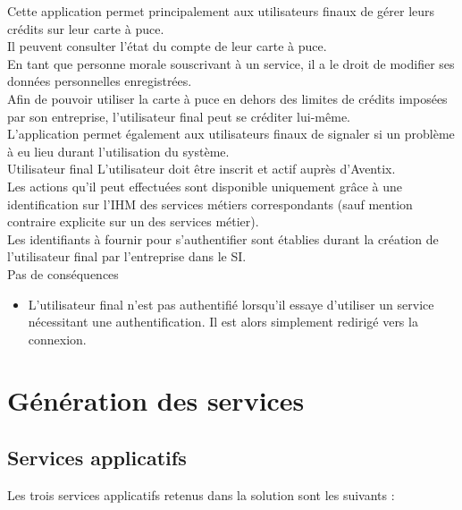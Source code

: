 \CUBref
{}%
{
  Cette application permet principalement aux utilisateurs finaux de gérer leurs
  crédits sur leur carte à puce. \\

  Il peuvent consulter l'état du compte de leur carte à puce. \\

  En tant que personne morale souscrivant à un service, il a le droit de
  modifier ses données personnelles enregistrées. \\

  Afin de pouvoir utiliser la carte à puce en dehors des limites de crédits
  imposées par son entreprise, l'utilisateur final peut se créditer lui-même. \\

  L'application permet également aux utilisateurs finaux de signaler si un
  problème à eu lieu durant l'utilisation du système. \\
}
{Utilisateur final}
{
  L'utilisateur doit être inscrit et actif auprès d'Aventix. \\

  Les actions qu'il peut effectuées sont disponible uniquement grâce à une
  identification sur l'IHM des services métiers correspondants (sauf mention
  contraire explicite sur un des services métier). \\

  Les identifiants à fournir pour s'authentifier sont établies durant
  la création de l'utilisateur final par l'entreprise dans le SI. \\
}
{Pas de conséquences}
{
  \begin{itemize}
    \item L'utilisateur final n'est pas authentifié lorsqu'il essaye d'utiliser
      un service nécessitant une authentification. Il est alors simplement
      redirigé vers la connexion.
  \end{itemize}
}

\section{Génération des services}
\subsection{Services applicatifs}
Les trois services applicatifs retenus dans la solution sont les suivants : \\

